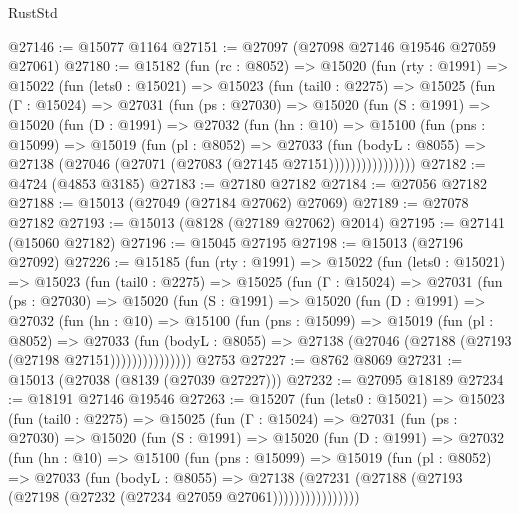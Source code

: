 \begin{lexlean}{RustStd}
\begin{coremodule}
@27146 := @15077 @1164
@27151 := @27097 (@27098 @27146 @19546 @27059 @27061)
@27180 := @15182
    (fun (rc : @8052) =>
    @15020
      (fun (rty : @1991) =>
      @15022
        (fun (lets0 : @15021) =>
        @15023
          (fun (tail0 : @2275) =>
          @15025
            (fun (Γ : @15024) =>
            @27031
              (fun (ps : @27030) =>
              @15020
                (fun (S : @1991) =>
                @15020
                  (fun (D : @1991) =>
                  @27032
                    (fun (hn : @10) =>
                    @15100
                      (fun (pns : @15099) =>
                      @15019
                        (fun (pl : @8052) =>
                        @27033
                          (fun (bodyL : @8055) =>
                          @27138 (@27046 (@27071 (@27083 (@27145 @27151))))))))))))))))
@27182 := @4724 (@4853 @3185)
@27183 := @27180 @27182
@27184 := @27056 @27182
@27188 := @15013 (@27049 (@27184 @27062) @27069)
@27189 := @27078 @27182
@27193 := @15013 (@8128 (@27189 @27062) @2014)
@27195 := @27141 (@15060 @27182)
@27196 := @15045 @27195
@27198 := @15013 (@27196 @27092)
@27226 := @15185
    (fun (rty : @1991) =>
    @15022
      (fun (lets0 : @15021) =>
      @15023
        (fun (tail0 : @2275) =>
        @15025
          (fun (Γ : @15024) =>
          @27031
            (fun (ps : @27030) =>
            @15020
              (fun (S : @1991) =>
              @15020
                (fun (D : @1991) =>
                @27032
                  (fun (hn : @10) =>
                  @15100
                    (fun (pns : @15099) =>
                    @15019
                      (fun (pl : @8052) =>
                      @27033
                        (fun (bodyL : @8055) =>
                        @27138 (@27046 (@27188 (@27193 (@27198 @27151)))))))))))))))
    @2753
@27227 := @8762 @8069
@27231 := @15013 (@27038 (@8139 (@27039 @27227)))
@27232 := @27095 @18189
@27234 := @18191 @27146 @19546
@27263 := @15207
    (fun (lets0 : @15021) =>
    @15023
      (fun (tail0 : @2275) =>
      @15025
        (fun (Γ : @15024) =>
        @27031
          (fun (ps : @27030) =>
          @15020
            (fun (S : @1991) =>
            @15020
              (fun (D : @1991) =>
              @27032
                (fun (hn : @10) =>
                @15100
                  (fun (pns : @15099) =>
                  @15019
                    (fun (pl : @8052) =>
                    @27033
                      (fun (bodyL : @8055) =>
                      @27138
                        (@27231
                          (@27188 (@27193 (@27198 (@27232 (@27234 @27059 @27061))))))))))))))))

\end{coremodule}
\end{lexlean}

